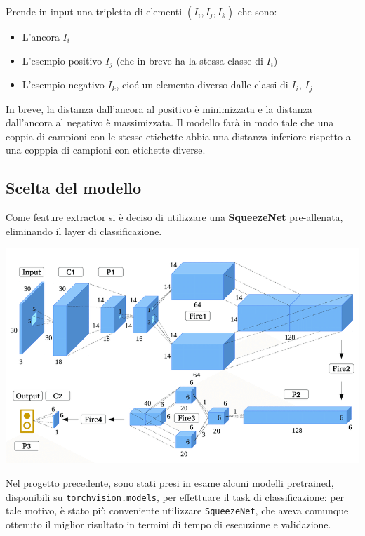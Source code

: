 \documentclass[11pt]{article}
\begin{document}
Prende in input una tripletta di elementi $(I_i, I_j, I_k)$ che sono:

\begin{itemize}
    \item L'ancora $I_i$ 
    \item L'esempio positivo $I_j$ (che in breve ha la stessa classe di $I_i$)
    \item L'esempio negativo $I_k$, cioé un elemento diverso dalle classi di $I_i$, $I_j$
\end{itemize}

In breve, la distanza dall'ancora al positivo è minimizzata e la distanza dall'ancora al negativo è massimizzata.
Il modello farà in modo tale che una coppia di campioni con le stesse etichette abbia una distanza inferiore rispetto a una copppia di campioni con etichette diverse.

\subsection{Scelta del modello}

Come feature extractor si è deciso di utilizzare una \textbf{SqueezeNet} pre-allenata, eliminando il layer di classificazione.

\begin{center}
    \begin{minipage}{0.48\linewidth}
    \includegraphics[width=\linewidth]{03.png}
    \end{minipage}
\end{center}

Nel progetto precedente, sono stati presi in esame alcuni modelli pretrained, disponibili su
\texttt{torchvision.models}, per effettuare il task di classificazione: per tale motivo,
è stato più conveniente utilizzare \texttt{SqueezeNet}, che aveva comunque ottenuto il miglior risultato in termini di tempo di esecuzione e validazione.
\end{document}
